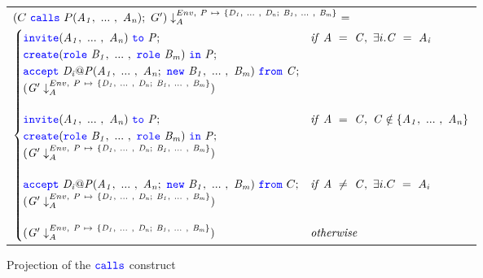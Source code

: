 \documentclass[12pt,twoside]{report}
\begin{document}
\begin{figure}[!h]
    \begin{center}
        \begin{tabular}{l}
            $(C\ \calls\ P(\roles{A}{n});\ G') \projectenv{Env,\ P\ \mapsto\ \{\roles{D}{n};\ \roles{B}{m}\}}\ =$\\[3.5pt]
            \begin{math}
                \begin{cases}
                    \invite(\roles{A}{n})\ \scrto\ \mathit{P}; & \mathit{if}\ \mathit{A}\ =\ \mathit{C},\ \exists i. \mathit{C}\ =\ \mathit{A_i}\\[0.25pt]
                    \create(\rolessig{B}{m})\ \scrin\ \mathit{P}; & \\[0.25pt]
                    \accept\ \mathit{D_i@P}(\roles{A}{n};\ \scrnew\ \roles{B}{m})\ \from\ \mathit{C}; & \\[0.25pt]
                    (\mathit{G'} \projectenv{Env,\ P\ \mapsto\ \{\roles{D}{n};\ \roles{B}{m}\}}) & \\[13pt]

                    \invite(\roles{A}{n})\ \scrto\ \mathit{P}; & \mathit{if}\ \mathit{A}\ =\ \mathit{C},\ \mathit{C} \notin \{\roles{A}{n}\} \\[0.25pt]
                    \create(\rolessig{B}{m})\ \scrin\ \mathit{P}; &\\[0.25pt]
                    (\mathit{G'} \projectenv{Env,\ P\ \mapsto\ \{\roles{D}{n};\ \roles{B}{m}\}}) &\\[13pt]

                    \accept\ \mathit{D_i@P}(\roles{A}{n};\ \scrnew\ \roles{B}{m})\ \from\ C; & \mathit{if}\ \mathit{A}\ \neq\ \mathit{C},\ \exists i. C\ =\ A_i\\[0.25pt]
                    (\mathit{G'} \projectenv{Env,\ P\ \mapsto\ \{\roles{D}{n};\ \roles{B}{m}\}}) & \\[13pt]

                    (\mathit{G'} \projectenv{Env,\ \mathit{P}\ \mapsto\ \{\roles{D}{n};\ \roles{B}{m}\}}) & \mathit{otherwise}
                \end{cases}
            \end{math}
        \end{tabular}
    \end{center}
    \caption{Projection of the ${\color{blue}\mathtt{calls}}$ construct}
    \label{scribble-calls-projection}
\end{figure}

\end{document}
